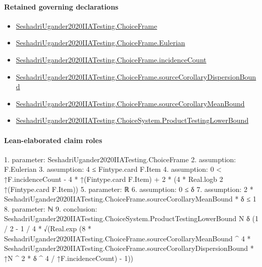 \documentclass[10pt]{article}
\begin{document}
\paragraph{Retained governing declarations}
\begin{itemize}\raggedright
\item \hyperlink{paper-prerequisite-0b24d39c6f4d1898}{Seshadri\allowbreak{}Ugander2020\allowbreak{}IIA\allowbreak{}Testing.\allowbreak{}Choice\allowbreak{}Frame}
\item \hyperlink{paper-prerequisite-182958924bb3d984}{Seshadri\allowbreak{}Ugander2020\allowbreak{}IIA\allowbreak{}Testing.\allowbreak{}Choice\allowbreak{}Frame.\allowbreak{}Eulerian}
\item \hyperlink{governing-declaration-01f88aa0e8a82d94}{Seshadri\allowbreak{}Ugander2020\allowbreak{}IIA\allowbreak{}Testing.\allowbreak{}Choice\allowbreak{}Frame.\allowbreak{}incidence\allowbreak{}Count}
\item \hyperlink{governing-declaration-022f0e0499966af9}{Seshadri\allowbreak{}Ugander2020\allowbreak{}IIA\allowbreak{}Testing.\allowbreak{}Choice\allowbreak{}Frame.\allowbreak{}source\allowbreak{}Corollary\allowbreak{}Dispersion\allowbreak{}Bound}
\item \hyperlink{governing-declaration-c427e473c40fc8cd}{Seshadri\allowbreak{}Ugander2020\allowbreak{}IIA\allowbreak{}Testing.\allowbreak{}Choice\allowbreak{}Frame.\allowbreak{}source\allowbreak{}Corollary\allowbreak{}Mean\allowbreak{}Bound}
\item \hyperlink{paper-prerequisite-46210e1105d79432}{Seshadri\allowbreak{}Ugander2020\allowbreak{}IIA\allowbreak{}Testing.\allowbreak{}Choice\allowbreak{}System.\allowbreak{}Product\allowbreak{}Testing\allowbreak{}Lower\allowbreak{}Bound}
\end{itemize}
\paragraph{Lean-elaborated claim roles}\begin{ReviewVerbatim}
1. parameter: SeshadriUgander2020IIATesting.ChoiceFrame
2. assumption: F.Eulerian
3. assumption: 4 ≤ Fintype.card F.Item
4. assumption: 0 < ↑F.incidenceCount - 4 * ↑(Fintype.card F.Item) + 2 * (4 * Real.logb 2 ↑(Fintype.card F.Item))
5. parameter: ℝ
6. assumption: 0 ≤ δ
7. assumption: 2 * SeshadriUgander2020IIATesting.ChoiceFrame.sourceCorollaryMeanBound * δ ≤ 1
8. parameter: ℕ
9. conclusion: SeshadriUgander2020IIATesting.ChoiceSystem.ProductTestingLowerBound N δ
  (1 / 2 -
    1 / 4 *
      √(Real.exp
            (8 * SeshadriUgander2020IIATesting.ChoiceFrame.sourceCorollaryMeanBound ^ 4 *
                    SeshadriUgander2020IIATesting.ChoiceFrame.sourceCorollaryDispersionBound *
                  ↑N ^ 2 *
                δ ^ 4 /
              ↑F.incidenceCount) -
          1))
\end{ReviewVerbatim}
\end{document}
